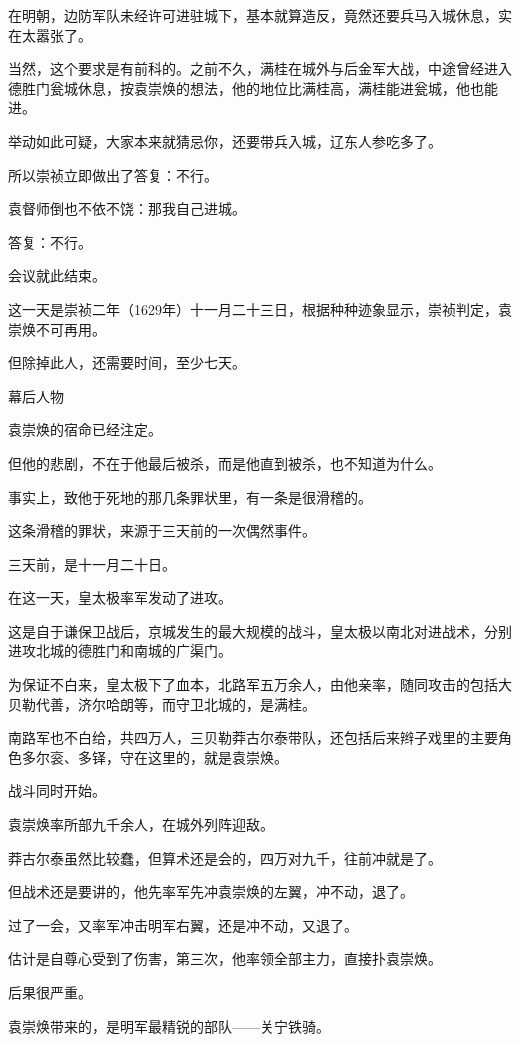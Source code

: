 \begin{multicols}{\theparacolNo}
		在明朝，边防军队未经许可进驻城下，基本就算造反，竟然还要兵马入城休息，实在太嚣张了。

		当然，这个要求是有前科的。之前不久，满桂在城外与后金军大战，中途曾经进入德胜门瓮城休息，按袁崇焕的想法，他的地位比满桂高，满桂能进瓮城，他也能进。

		举动如此可疑，大家本来就猜忌你，还要带兵入城，辽东人参吃多了。

		所以崇祯立即做出了答复：不行。

		袁督师倒也不依不饶：那我自己进城。

		答复：不行。

		会议就此结束。

		这一天是崇祯二年（1629年）十一月二十三日，根据种种迹象显示，崇祯判定，袁崇焕不可再用。

		但除掉此人，还需要时间，至少七天。

		幕后人物

		袁崇焕的宿命已经注定。

		但他的悲剧，不在于他最后被杀，而是他直到被杀，也不知道为什么。

		事实上，致他于死地的那几条罪状里，有一条是很滑稽的。

		这条滑稽的罪状，来源于三天前的一次偶然事件。

		三天前，是十一月二十日。

		在这一天，皇太极率军发动了进攻。

		这是自于谦保卫战后，京城发生的最大规模的战斗，皇太极以南北对进战术，分别进攻北城的德胜门和南城的广渠门。

		为保证不白来，皇太极下了血本，北路军五万余人，由他亲率，随同攻击的包括大贝勒代善，济尔哈朗等，而守卫北城的，是满桂。

		南路军也不白给，共四万人，三贝勒莽古尔泰带队，还包括后来辫子戏里的主要角色多尔衮、多铎，守在这里的，就是袁崇焕。

		战斗同时开始。

		袁崇焕率所部九千余人，在城外列阵迎敌。

		莽古尔泰虽然比较蠢，但算术还是会的，四万对九千，往前冲就是了。

		但战术还是要讲的，他先率军先冲袁崇焕的左翼，冲不动，退了。

		过了一会，又率军冲击明军右翼，还是冲不动，又退了。

		估计是自尊心受到了伤害，第三次，他率领全部主力，直接扑袁崇焕。

		后果很严重。

		袁崇焕带来的，是明军最精锐的部队——关宁铁骑。


\end{multicols}
